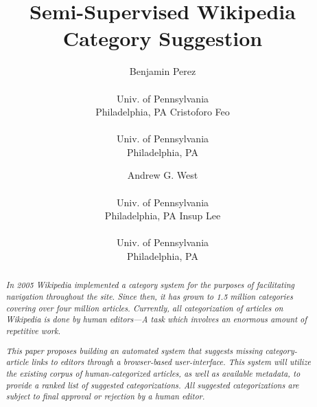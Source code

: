 \documentclass{sig-alternate}
\begin{document}
 

\title{Semi-Supervised Wikipedia Category Suggestion}
\subtitle{}
\author{
	\alignauthor Benjamin Perez \\  \\ Univ. of Pennsylvania \\ Philadelphia, PA
	\alignauthor Cristoforo Feo \\    \\ Univ. of Pennsylvania \\ Philadelphia, PA
\and
	\alignauthor Andrew G. West \\  \\ Univ. of Pennsylvania \\ Philadelphia, PA
	\alignauthor Insup Lee      \\      \\ Univ. of Pennsylvania \\ Philadelphia, PA
}
\date{}
\maketitle


\begin{abstract}
\textit{In 2005 Wikipedia implemented a category system for the purposes of facilitating navigation throughout the site. Since then, it has grown to 1.5 million categories covering over four million articles. Currently, all categorization of articles on Wikipedia is done by human editors---A task which involves an enormous amount of repetitive work.}

\textit{This paper proposes building an automated system that suggests missing category-article links to editors through a browser-based user-interface. This system will utilize the existing corpus of human-categorized articles, as well as available metadata, to provide a ranked list of suggested categorizations. All suggested categorizations are subject to final approval or rejection by a human editor.}
\end{abstract}


\end{document}

